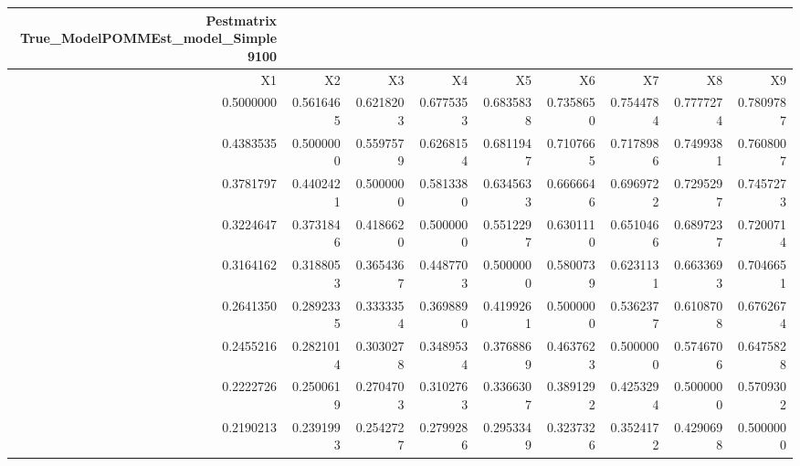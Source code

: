 \begin{longtable}{rrrrrrrrr}
\caption*{
{\large Pestmatrix} \\ 
{\small True\_ModelPOMMEst\_model\_Simple9100}
} \\ 
\toprule
X1 & X2 & X3 & X4 & X5 & X6 & X7 & X8 & X9 \\ 
\midrule
0.5000000 & 0.5616465 & 0.6218203 & 0.6775353 & 0.6835838 & 0.7358650 & 0.7544784 & 0.7777274 & 0.7809787 \\ 
0.4383535 & 0.5000000 & 0.5597579 & 0.6268154 & 0.6811947 & 0.7107665 & 0.7178986 & 0.7499381 & 0.7608007 \\ 
0.3781797 & 0.4402421 & 0.5000000 & 0.5813380 & 0.6345633 & 0.6666646 & 0.6969722 & 0.7295297 & 0.7457273 \\ 
0.3224647 & 0.3731846 & 0.4186620 & 0.5000000 & 0.5512297 & 0.6301110 & 0.6510466 & 0.6897237 & 0.7200714 \\ 
0.3164162 & 0.3188053 & 0.3654367 & 0.4487703 & 0.5000000 & 0.5800739 & 0.6231131 & 0.6633693 & 0.7046651 \\ 
0.2641350 & 0.2892335 & 0.3333354 & 0.3698890 & 0.4199261 & 0.5000000 & 0.5362377 & 0.6108708 & 0.6762674 \\ 
0.2455216 & 0.2821014 & 0.3030278 & 0.3489534 & 0.3768869 & 0.4637623 & 0.5000000 & 0.5746706 & 0.6475828 \\ 
0.2222726 & 0.2500619 & 0.2704703 & 0.3102763 & 0.3366307 & 0.3891292 & 0.4253294 & 0.5000000 & 0.5709302 \\ 
0.2190213 & 0.2391993 & 0.2542727 & 0.2799286 & 0.2953349 & 0.3237326 & 0.3524172 & 0.4290698 & 0.5000000 \\ 
\bottomrule
\end{longtable}


